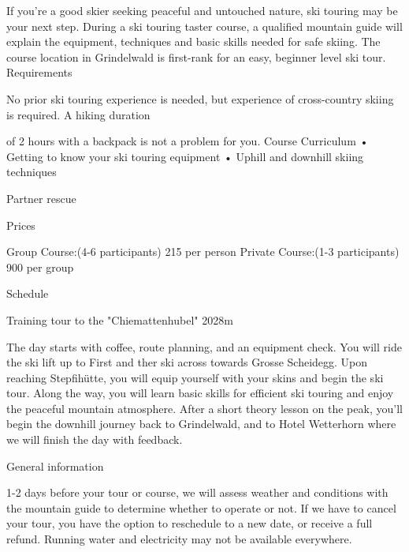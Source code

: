 \documentclass{英语试卷}
\begin{document}
\par If you're a good skier seeking peaceful and untouched nature, ski touring may be your next step. During a ski touring taster course, a qualified mountain guide will explain the equipment, techniques and basic skills needed for safe skiing. The course location in Grindelwald is first-rank for an easy, beginner level ski tour. Requirements\par
\par No prior ski touring experience is needed, but experience of cross-country skiing is required. A hiking duration\par
\par of 2 hours with a backpack is not a problem for you. Course Curriculum • Getting to know your ski touring equipment • Uphill and downhill skiing techniques\par
\par Partner rescue\par
\par Prices\par
\par Group Course:(4-6 participants) 215 per person Private Course:(1-3 participants) 900 per group\par
\par Schedule\par
\par Training tour to the "Chiemattenhubel" 2028m\par
\par The day starts with coffee, route planning, and an equipment check. You will ride the ski lift up to First and ther ski across towards Grosse Scheidegg. Upon reaching Stepfihütte, you will equip yourself with your skins and begin the ski tour. Along the way, you will learn basic skills for efficient ski touring and enjoy the peaceful mountain atmosphere. After a short theory lesson on the peak, you'll begin the downhill journey back to Grindelwald, and to Hotel Wetterhorn where we will finish the day with feedback.\par
\par General information\par
\par 1-2 days before your tour or course, we will assess weather and conditions with the mountain guide to determine whether to operate or not. If we have to cancel your tour, you have the option to reschedule to a new date, or receive a full refund. Running water and electricity may not be available everywhere.\par
\end{document}
